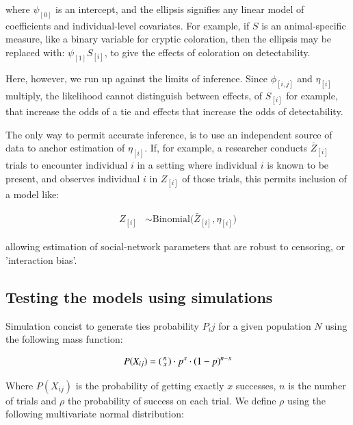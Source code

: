 \documentclass[Afour,sageh,times]{sagej}
\begin{document}
where $\psi_{[0]}$ is an intercept, and the ellipsis signifies any linear model of coefficients and individual-level covariates. For example, if $S$ is an animal-specific measure, like a binary variable for cryptic coloration, then the ellipsis  may be replaced with:  $\psi_{[1]}S_{[i]}$, to give the effects of coloration on detectability.

Here, however, we run up against the limits of inference. Since $\phi_{[i,j]}$ and $\eta_{[i]}$ multiply, the likelihood cannot distinguish between effects, of $S_{[i]}$ for example, that increase the odds of a tie and effects that increase the odds of detectability.

The only way to permit accurate inference, is to use an independent source of data to anchor estimation of $\eta_{[i]}$. If, for example, a researcher conducts $\bar Z_{[i]}$ trials to encounter individual $i$ in a setting where individual $i$ is known to be present, and observes individual $i$ in $Z_{[i]}$ of those trials, this permits inclusion of a model like:
\begin{ceqn}
\begin{align}\label{maineq2}
 Z_{[i]} &\sim \mathrm{Binomial}\Big(\bar Z_{[i]}, \eta_{[i]} \Big)
\end{align}
\end{ceqn}
allowing estimation of social-network parameters that are robust to censoring, or 'interaction bias'.

\subsection{Testing the models using simulations}
 
Simulation concist to generate ties probability $P_ij$ for a given population $N$ using the following mass function:

\begin{ceqn}
  \begin{align}\label{mass}
    P(X_{ij}) = 
    \begin{psmallmatrix}
      n\\
      x
    \end{psmallmatrix}\cdot   p^{x} \cdot (1-p)^{n-x}  
  \end{align}    
\end{ceqn}
Where $P(X_{ij})$ is the probability of getting exactly $x$ successes, $n$ is the number of trials and $\rho$ the probability of success on each trial. We define $\rho$ using the following multivariate normal distribution:
\end{document}
